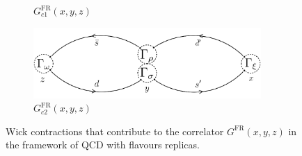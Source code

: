 \documentclass[english, LaM, oneside, noexaminfo]{sapthesis}
\begin{document}
\begin{figure}[h!]
\begin{subfigure}[b]{0.49\textwidth}
        \caption{$G_{c1}^\text{FR}(x,y,z)$}
    \end{subfigure}
    \begin{subfigure}[b]{0.49\textwidth}
        \centering
        \includegraphics[width=0.95\textwidth]{imgs-MSc-thesis/Wick_C2.png}
        \caption{$G_{c2}^\text{FR}(x,y,z)$}
    \end{subfigure}
    \caption{Wick contractions that contribute to the correlator $G^\text{FR}(x,y,z)$ in the framework of QCD with flavours replicas.}
    \label{fig:contractions-general}
\end{figure}
\end{document}
